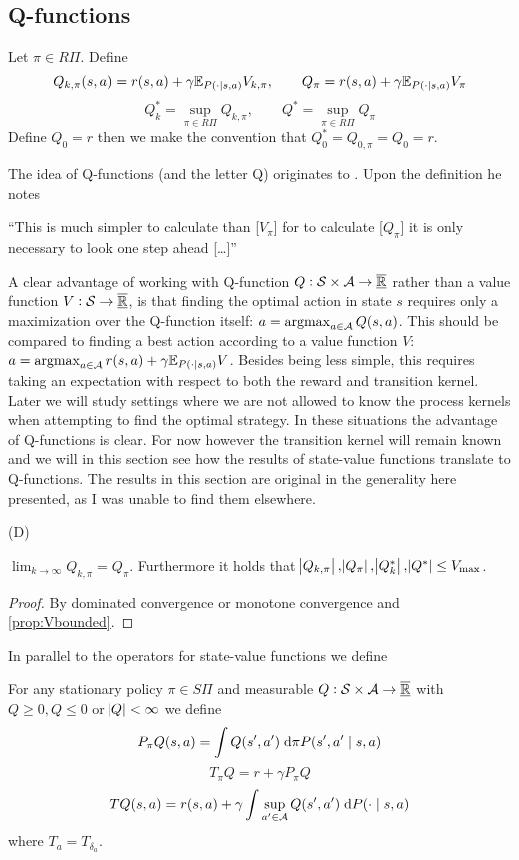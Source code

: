 \subsection{Q-functions}
\begin{defn}
  Let $\pi \in R\Pi$.
  Define
  \[ Q_{k, \pi}(s, a) = r(s, a) + \gamma \mathbb{E}_{P(\cdot \mid s, a)} V_{k, \pi}
  ,\qquad Q_\pi = r(s, a) + \gamma \mathbb{E}_{P(\cdot \mid s, a)} V_\pi \]
  \[ Q^*_k = \sup_{\pi \in R\Pi} Q_{k, \pi}
  , \qquad Q^* = \sup_{\pi \in R\Pi} Q_\pi \]
  Define $Q_0 = r$ then we make the convention that
  $Q^*_0 = Q_{0,\pi} = Q_0 = r$.
\end{defn}
The idea of Q-functions (and the letter Q) originates to
. Upon the definition he notes
\begin{displayquote}
  ``This is much simpler to calculate than [$V_\pi$]
  for to calculate [$Q_\pi$] it is only necessary to look one
  step ahead [\ldots]''
\end{displayquote}
A clear advantage of working with Q-function
$Q:\mathcal{S}\times\mathcal{A} \to \overline{\underline{\mathbb{R}}}$ rather than a value function
$V:\mathcal{S}\to \overline{\underline{\mathbb{R}}}$,
is that finding the optimal action in state $s$
requires only a maximization over the Q-function itself:
$a = \operatorname*{argmax}_{a \in \mathcal{A}} Q(s,a)$.
This should be compared to finding a best action according to a value
function $V$:
$a = \operatorname*{argmax}_{a \in \mathcal{A}} r(s,a) + \gamma \mathbb{E}_{P(\cdot \mid s,a)} V$.
Besides being less simple,
this requires taking an expectation with respect to 
both the reward and transition kernel.
Later we will study settings where we are not allowed to know
the process kernels when attempting to find the optimal strategy.
In these situations the advantage of Q-functions is clear.
For now however the transition kernel will remain known and we
will in this section see how the results of state-value functions
translate to Q-functions.
The results in this section are original in the generality here presented,
as I was unable to find them elsewhere.

\begin{prop} (D)

  $\lim_{k \to \infty} Q_{k, \pi} = Q_\pi$. Furthermore it holds that
  $\abs{Q_{k, \pi}}, \abs{Q_\pi}, \abs{Q^*_k}, \abs{Q^*} \leq V_{\max}$.
\end{prop}
\begin{proof}
  By dominated convergence or monotone convergence and \cref{prop:Vbounded}.
\end{proof}

In parallel to the operators for state-value functions we define
\begin{defn}
  For any stationary policy $\pi \in S\Pi$
  and measurable $Q:\mathcal{S} \times \mathcal{A} \to \overline{\underline{\mathbb{R}}}$ with
  $Q \geq 0, Q \leq 0$ or $\abs{Q} < \infty$ we define
  \[ P_\pi Q(s, a) = \int Q(s', a') \; \mathrm{d} \pi P(s', a' \mid s, a) \]
  \[ T_\pi Q = r + \gamma P_\pi Q \]
  \[ T Q(s, a) = r(s, a) + \gamma
  \int \sup_{a' \in \mathcal{A}} Q(s', a') \; \mathrm{d} P(\cdot \mid s, a) \]
  where $T_a = T_{\delta_a}$.
\end{defn}
 
